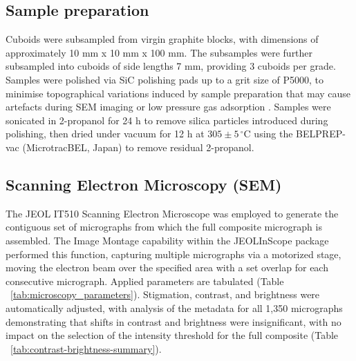 \documentclass[review]{elsarticle}
\begin{document}
\begin{table}[b]
  \centering
  \caption{Formation characteristics and properties of IG-110 and IG-430 nuclear grade graphites \citep{Jones2018, ARREGUIMENA2022112047}}
  \label{tab:materialstable}
\end{table}

\subsection{Sample preparation}
Cuboids were subsampled from virgin graphite blocks, with dimensions of
approximately 10 mm x 10 mm x 100 mm. The subsamples were further subsampled
into cuboids of side lengths 7 mm, providing 3 cuboids per grade. Samples were
polished via SiC polishing pads up to a grit size of P5000, to minimise
topographical variations induced by sample preparation that may cause artefacts
during SEM imaging or low pressure gas adsorption \citep{Fang2022,Jones2018}.
Samples were sonicated in 2-propanol for 24 h to remove silica particles
introduced during polishing, then dried under vacuum for 12 h at $305 \pm 5
\,^\circ\mathrm{C}$ using the BELPREP-vac (MicrotracBEL, Japan) to remove residual
2-propanol.

\subsection{Scanning Electron Microscopy (SEM)}

The JEOL IT510 Scanning Electron Microscope was employed to generate the
contiguous set of micrographs from which the full composite micrograph is
assembled. The Image Montage capability within the JEOLInScope package performed
this function, capturing multiple micrographs via a motorized stage, moving the
electron beam over the specified area with a set overlap for each consecutive
micrograph. Applied parameters are tabulated (Table
~\ref{tab:microscopy_parameters}). Stigmation, contrast, and brightness were
automatically adjusted, with analysis of the metadata for all 1,350 micrographs
demonstrating that shifts in contrast and brightness were insignificant, with no
impact on the selection of the intensity threshold for the full composite (Table
~\ref{tab:contrast-brightness-summary}). 
\end{document}
